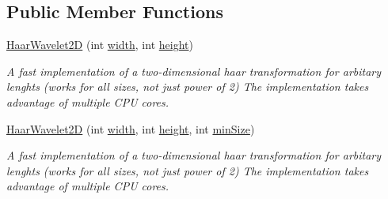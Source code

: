 \subsection*{\-Public \-Member \-Functions}
\begin{DoxyCompactItemize}
\item 
\hyperlink{class_turbo_wavelets_1_1_haar_wavelet2_d_ab55a20658fe1f22b6e756418b4e1dc29}{\-Haar\-Wavelet2\-D} (int \hyperlink{class_turbo_wavelets_1_1_wavelet2_d_aaa4b3711957fe1798980e6891331a08d}{width}, int \hyperlink{class_turbo_wavelets_1_1_wavelet2_d_afb2aa87b89b82f329357cbdc0cde18a8}{height})
\begin{DoxyCompactList}\small\item\em \-A fast implementation of a two-\/dimensional haar transformation for arbitary lenghts (works for all sizes, not just power of 2) \-The implementation takes advantage of multiple \-C\-P\-U cores. \end{DoxyCompactList}\item 
\hyperlink{class_turbo_wavelets_1_1_haar_wavelet2_d_a8064166eec2c0a4b66378896b882bd47}{\-Haar\-Wavelet2\-D} (int \hyperlink{class_turbo_wavelets_1_1_wavelet2_d_aaa4b3711957fe1798980e6891331a08d}{width}, int \hyperlink{class_turbo_wavelets_1_1_wavelet2_d_afb2aa87b89b82f329357cbdc0cde18a8}{height}, int \hyperlink{class_turbo_wavelets_1_1_wavelet2_d_af5148ef1a46dd5694ccea13aa8f1b9e2}{min\-Size})
\begin{DoxyCompactList}\small\item\em \-A fast implementation of a two-\/dimensional haar transformation for arbitary lenghts (works for all sizes, not just power of 2) \-The implementation takes advantage of multiple \-C\-P\-U cores. \end{DoxyCompactList}\end{DoxyCompactItemize}
